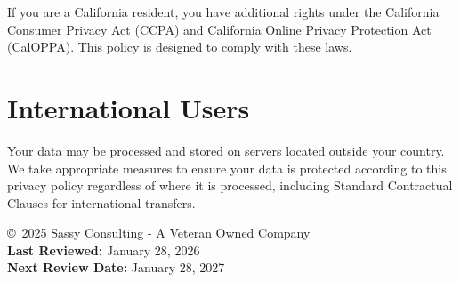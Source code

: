 \documentclass[11pt,letterpaper]{article}
\begin{document}
If you are a California resident, you have additional rights under the California Consumer Privacy Act (CCPA) and California Online Privacy Protection Act (CalOPPA). This policy is designed to comply with these laws.

\section{International Users}

Your data may be processed and stored on servers located outside your country. We take appropriate measures to ensure your data is protected according to this privacy policy regardless of where it is processed, including Standard Contractual Clauses for international transfers.

\vfill
\begin{center}
\copyright~2025 Sassy Consulting - A Veteran Owned Company \\[0.5em]
\textbf{Last Reviewed:} January 28, 2026 \\
\textbf{Next Review Date:} January 28, 2027
\end{center}
\end{document}
